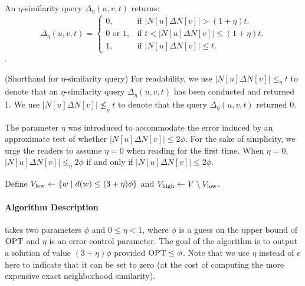 \begin{definition} An $\eta$-similarity query $\Delta_{\eta}(u,v,t)$ returns: 
$$\Delta_{\eta}(u,v,t) =   \begin{cases}0, &\mbox{if $|N[u] \Delta N[v]| > (1+\eta)t$.} \\ \mbox{$0$ or $1$}, &\mbox{if $t <  |N[u] \Delta N[v]| \leq (1+\eta)t$.} \\ 1, &\mbox{if $|N[u] \Delta N[v]| \leq t$.} \end{cases}$$.
\end{definition}

\begin{definition} (Shorthand for $\eta$-similarity query) For readability, we use \( |N[u] \Delta N[v]| \leq_{\eta} t \) to denote that an \( \eta \)-similarity query \( \Delta_{\eta}(u,v,t) \) has been conducted and returned 1. We use \( |N[u] \Delta N[v]| \nleq_{\eta} t \) to denote that the query \( \Delta_{\eta}(u,v,t) \) returned 0.
\end{definition}

The parameter $\eta$ was introduced to accommodate the error induced by an approximate test of whether $|N[u] \Delta N[v]| \leq 2\phi$. For the sake of simplicity, we urge the readers to assume $\eta = 0$ when reading for the first time. When $\eta = 0$, $|N[u] \Delta N[v]| \leq_{\eta} 2\phi$ if and only if $|N[u] \Delta N[v]| \leq 2\phi$.

\begin{definition} Define $V_{\operatorname{low}} \leftarrow \{w \mid \mbox{$d(w) \leq (3+\eta) \phi$} \}$ and $V_{\operatorname{high}} \leftarrow V \setminus V_{\operatorname{low}}$. \end{definition}


\paragraph{Algorithm Description}  takes two parameters $\phi$ and $0 \leq \eta < 1$, where $\phi$ is a guess on the upper bound of $\mathrm{OPT}$ and $\eta$ is an error control parameter.  The goal of the algorithm is to output a solution of value $(3+\eta)\phi$ provided $\mathrm{OPT} \leq \phi$. Note that we use $\eta$ instead of $\epsilon$ here to indicate that it can be set to zero (at the cost of computing the more expensive exact neighborhood similarity). 


